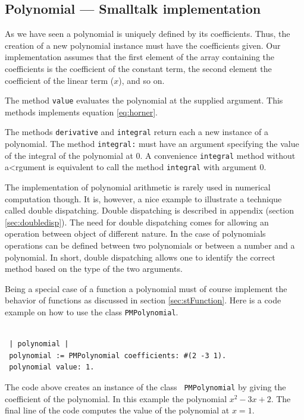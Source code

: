 \documentclass[twoside]{book}
\begin{document}
\subsection{Polynomial --- Smalltalk implementation}
As we have seen a polynomial is uniquely defined by its
coefficients. Thus, the creation of a new polynomial instance must
have the coefficients given. Our implementation assumes that the
first element of the array containing the coefficients is the
coefficient of the constant term, the second element the
coefficient of the linear term ($x$), and so on.

The method {\tt value} evaluates the polynomial at the supplied
argument. This methods implements equation \ref{eq:horner}.

The methods {\tt derivative} and {\tt integral} return each a new
instance of a polynomial. The method {\tt integral:} must have an
argument specifying the value of the integral of the polynomial at
0. A convenience {\tt integral} method without a<rgument is
equivalent to call the method {\tt integral} with argument 0.

The implementation of polynomial arithmetic is rarely used in
numerical computation though. It is, however, a nice example to
illustrate a technique called double dispatching. Double
dispatching is described in appendix (\cf section
\ref{sec:doubledisp}). The need for double dispatching comes for
allowing an operation between object of different nature. In the
case of polynomials operations can be defined between two
polynomials or between a number and a polynomial. In short, double
dispatching allows one to identify the correct method based on the
type of the two arguments.

Being a special case of a function a polynomial must of course implement the behavior of
functions as discussed in section \ref{sec:stFunction}.
Here is a code example on how to use the class {\tt PMPolynomial}.
\begin{codeExample}
\begin{verbatim}

 | polynomial |
 polynomial := PMPolynomial coefficients: #(2 -3 1).
 polynomial value: 1.
\end{verbatim}
\end{codeExample}
The code above creates an instance of the class {\tt
PMPolynomial} by giving the coefficient of the polynomial. In
this example the polynomial $x^2-3x+2$. The final line of the code
computes the value of the polynomial at $x=1$.
\end{document}
